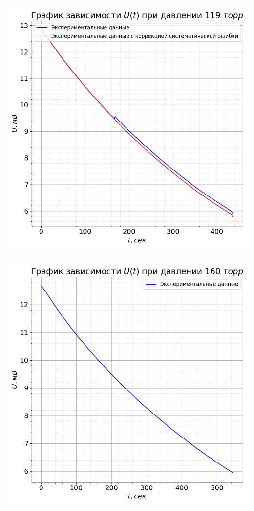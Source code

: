 \documentclass[a4paper, 12pt]{article}
\begin{document}
        \begin{minipage}{0.47\textwidth}
            \includegraphics[width=1\linewidth]{graphs/raw119.png}
        \end{minipage}
        \begin{minipage}{0.47\textwidth}
            \includegraphics[width=1\linewidth]{graphs/raw160.png}
        \end{minipage}
\end{document}
